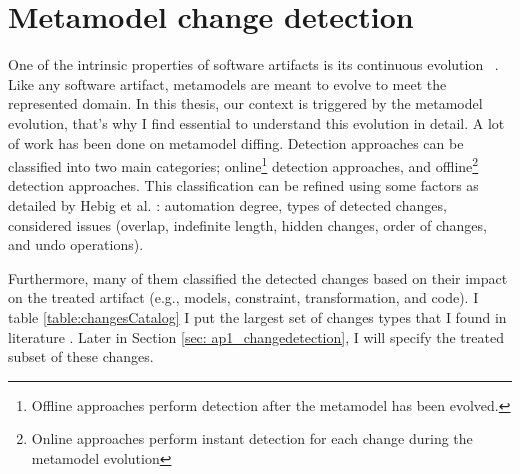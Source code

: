  \section{Metamodel change detection}
 \label{changedetection}
 One of the intrinsic properties of software artifacts is its continuous evolution ~\cite{mens2008introduction}. Like any software artifact, metamodels are meant to evolve to meet the represented domain. %
 In this thesis, our context is triggered by the metamodel evolution, that's why I find essential to understand this evolution in detail.
 A lot of work has been done on metamodel diffing.
 Detection approaches can be classified into two main categories; online\footnote{Offline approaches perform detection after the metamodel has been evolved.} detection approaches, and offline\footnote{Online approaches perform instant detection for each change during the metamodel evolution} detection approaches. This classification can be refined using some factors as detailed by Hebig et al. \cite{hebig2016approaches}: automation degree, types of detected changes, considered issues (overlap, indefinite length, hidden changes, order of changes, and undo operations)\cite{hebig2016approaches}.
 
 
  Furthermore, many of them classified the detected changes based on their impact on the treated artifact (e.g., models, constraint, transformation, and code). I table \ref{table:changesCatalog} I put the largest set of changes types that I found in literature \cite{herrmannsdoerfer_extensive_2011}. Later in Section \ref{sec: ap1_changedetection}, I will specify the treated subset of these changes. 
 
